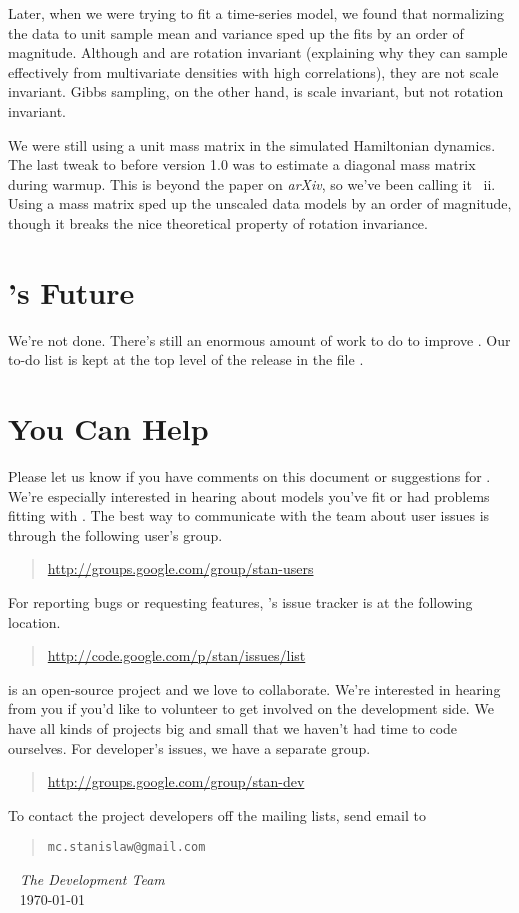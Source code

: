 Later, when we were trying to fit a time-series model, we found that
normalizing the data to unit sample mean and variance sped up the fits
by an order of magnitude.  Although \HMC and \NUTS are rotation
invariant (explaining why they can sample effectively from
multivariate densities with high correlations), they are not scale
invariant.  Gibbs sampling, on the other hand, is scale invariant, but
not rotation invariant.

We were still using a unit mass matrix in the simulated Hamiltonian
dynamics.  The last tweak to \Stan before version 1.0 was to estimate
a diagonal mass matrix during warmup.  This is beyond the \NUTS paper
on {\it arXiv}, so we've been calling it \NUTS~{\sc ii}.  Using a mass
matrix sped up the unscaled data models by an order of magnitude,
though it breaks the nice theoretical property of rotation invariance.

\section*{\Stan's Future}

We're not done. There's still an enormous amount of work to do to
improve \Stan.  Our to-do list is kept at the top level of the release
in the file .  

\section*{You Can Help}

Please let us know if you have comments on this document or
suggestions for \Stan.  We're especially interested in hearing about
models you've fit or had problems fitting with \Stan.  The best way to
communicate with the \Stan team about user issues is through the
following user's group.
%
\begin{quote}
\url{http://groups.google.com/group/stan-users}
\end{quote}
%
For reporting bugs or requesting features, \Stan's issue tracker is at
the following location.
%
\begin{quote}
\url{http://code.google.com/p/stan/issues/list}
\end{quote}

\Stan is an open-source project and we love to collaborate.  We're
interested in hearing from you if you'd like to volunteer to get
involved on the development side.  We have all kinds of projects big
and small that we haven't had time to code ourselves.  For developer's
issues, we have a separate group.
%
\begin{quote}
\url{http://groups.google.com/group/stan-dev}
\end{quote}

To contact the project developers off the mailing lists, send email to
\begin{quote}
\begin{verbatim}
mc.stanislaw@gmail.com
\end{verbatim}
\end{quote}

\vspace*{12pt}
\mbox{ } \hfill {\it The \Stan Development Team}
\\
\mbox{ } \hfill \today
